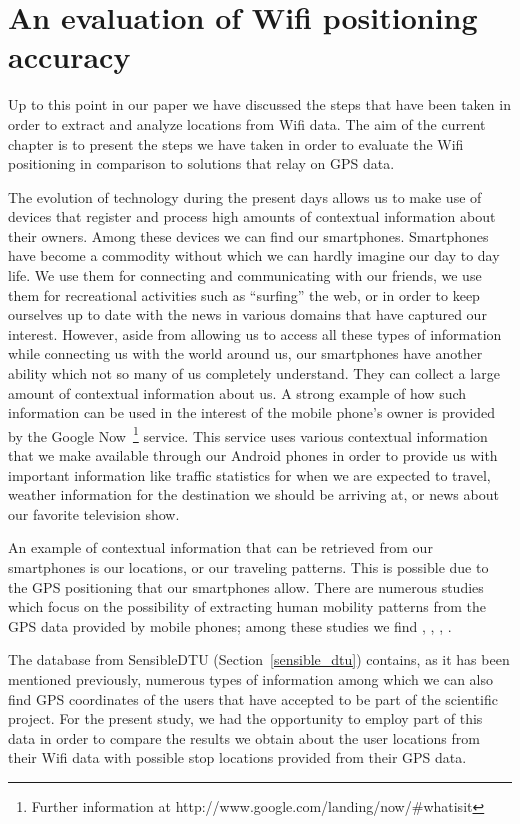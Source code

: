 \chapter{An evaluation of Wifi positioning accuracy} 

Up to this point in our paper we have discussed the steps that have been
taken in order to extract and analyze locations from Wifi data. The aim of the
current chapter is to present the steps we have taken in order to evaluate the
Wifi positioning in comparison to solutions that relay on GPS data.

The evolution of technology during the present days allows us to make use of
devices that register and process high amounts of contextual information about
their owners. Among these devices we can find our smartphones. Smartphones have
become a commodity without which we can hardly imagine our day to day life. We
use them for connecting and communicating with our friends, we use them for
recreational activities such as ``surfing'' the web, or in order to keep
ourselves up to date with the news in various domains that have captured our
interest. However, aside from allowing us to access all these types of
information while connecting us with the world around us, our smartphones have
another ability which not so many of us completely understand. They can collect
a large amount of contextual information about us. A strong example of how such
information can be used in the interest of the mobile phone's owner is provided
by the Google Now~\footnote{Further information at
http://www.google.com/landing/now/\#whatisit} service. This service uses various
contextual information that we make available through our Android phones in
order to provide us with important information like traffic statistics for when
we are expected to travel, weather information for the destination we should be
arriving at, or news about our favorite television show.

An example of contextual information that can be retrieved from our smartphones
is our locations, or our traveling patterns. This is possible due to the GPS
positioning that our smartphones allow. There are numerous studies which focus
on the possibility of extracting human mobility patterns from the GPS data
provided by mobile phones; among these studies we find
\cite{Montoliu:2010:DHP:1899475.1899487},
\cite{cuttone2014inferring},
\cite{Zhou:2007:DPM:1247715.1247718}, \cite{Ashbrook:2003:UGL:945305.945310}.

The database from SensibleDTU (Section~\ref{sensible_dtu}) contains, as it has
been mentioned previously, numerous types of information among which we can also
find GPS coordinates of the users that have accepted to be part of the
scientific project. For the present study, we had the opportunity to employ part
of this data in order to compare the results we obtain about the user locations
from their Wifi data with possible stop locations provided from their GPS data.

